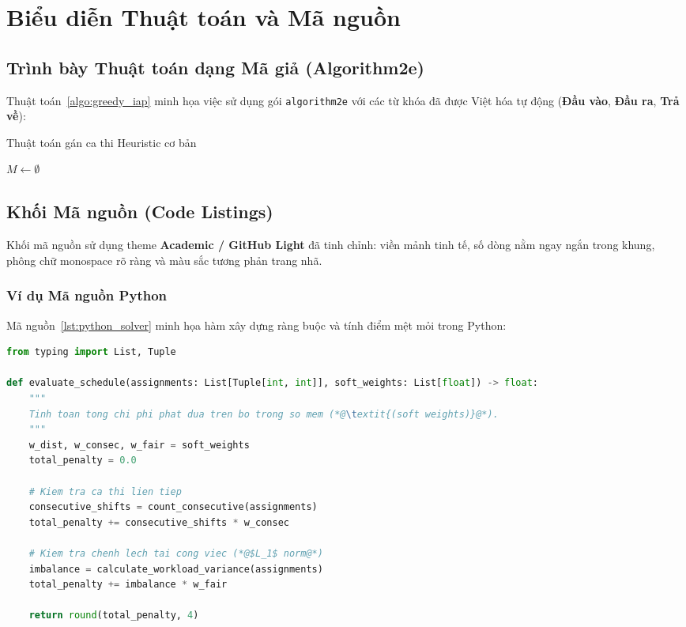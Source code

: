 \section{Biểu diễn Thuật toán và Mã nguồn}
\label{sec:algo_code}

\subsection{Trình bày Thuật toán dạng Mã giả (Algorithm2e)}
Thuật toán~\ref{algo:greedy_iap} minh họa việc sử dụng gói \texttt{algorithm2e} với các từ khóa đã được Việt hóa tự động (\textbf{Đầu vào}, \textbf{Đầu ra}, \textbf{Trả về}):

\begin{algorithm}[H]
\caption{Thuật toán gán ca thi Heuristic cơ bản}
\label{algo:greedy_iap}
\LinesNumbered
{}

$M \leftarrow \emptyset$\;
\;
\end{algorithm}

\subsection{Khối Mã nguồn (Code Listings)}
Khối mã nguồn sử dụng theme \textbf{Academic / GitHub Light} đã tinh chỉnh: viền mảnh tinh tế, số dòng nằm ngay ngắn trong khung, phông chữ monospace rõ ràng và màu sắc tương phản trang nhã.

\subsubsection{Ví dụ Mã nguồn Python}
Mã nguồn~\ref{lst:python_solver} minh họa hàm xây dựng ràng buộc và tính điểm mệt mỏi trong Python:

\begin{lstlisting}[language=Python, caption={Hàm kiểm tra trùng lịch và tính phạt mệt mỏi trong Python}, label={lst:python_solver}]
from typing import List, Tuple

def evaluate_schedule(assignments: List[Tuple[int, int]], soft_weights: List[float]) -> float:
    """
    Tinh toan tong chi phi phat dua tren bo trong so mem (*@\textit{(soft weights)}@*).
    """
    w_dist, w_consec, w_fair = soft_weights
    total_penalty = 0.0

    # Kiem tra ca thi lien tiep
    consecutive_shifts = count_consecutive(assignments)
    total_penalty += consecutive_shifts * w_consec

    # Kiem tra chenh lech tai cong viec (*@$L_1$ norm@*)
    imbalance = calculate_workload_variance(assignments)
    total_penalty += imbalance * w_fair

    return round(total_penalty, 4)
\end{lstlisting}

